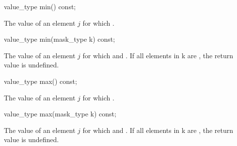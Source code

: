 \begin{itemdecl}
value_type min() const;
\end{itemdecl}
\begin{itemdescr}
  \pnum\returns The value of an element $j$ for which  \foralli.
\end{itemdescr}

\begin{itemdecl}
value_type min(mask_type k) const;
\end{itemdecl}
\begin{itemdescr}
  \pnum\returns The value of an element $j$ for which  and  \foralli.
  \pnum\remarks If all elements in \code k are \false, the return value is undefined.%
\end{itemdescr}

\begin{itemdecl}
value_type max() const;
\end{itemdecl}
\begin{itemdescr}
  \pnum\returns The value of an element $j$ for which  \foralli.
\end{itemdescr}

\begin{itemdecl}
value_type max(mask_type k) const;
\end{itemdecl}
\begin{itemdescr}
  \pnum\returns The value of an element $j$ for which  and  \foralli.
  \pnum\remarks If all elements in \code k are \false, the return value is undefined.%
\end{itemdescr}


